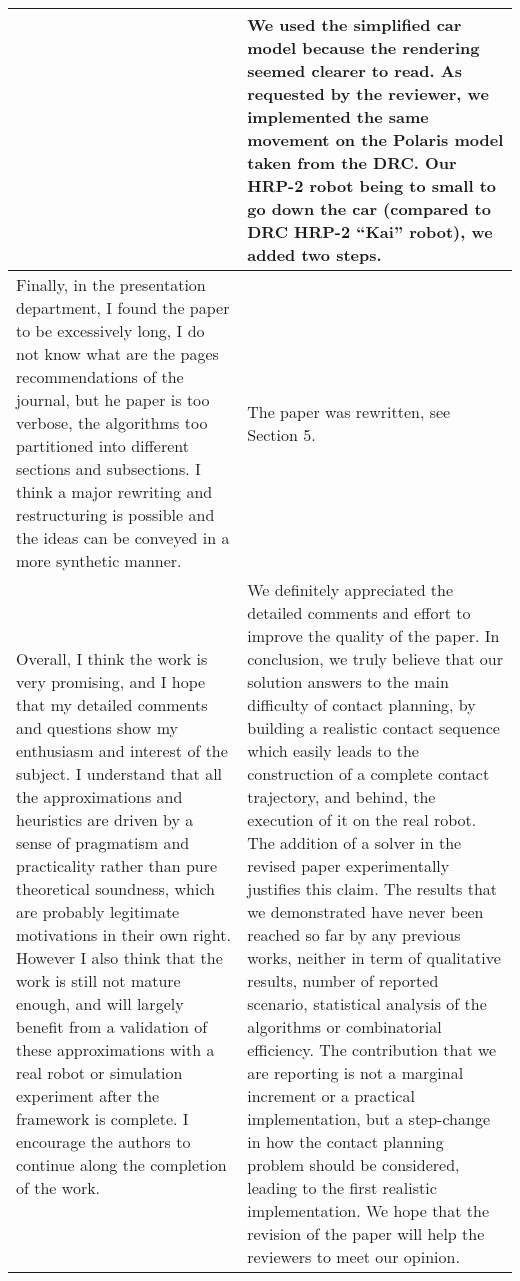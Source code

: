 \documentclass[a4paper]{article}
\begin{document}
\begin{longtable}{|p{21em}|p{21em}|}
&
We used the simplified car model because the rendering seemed clearer to read.
As requested by the reviewer, we implemented the same movement on the Polaris model taken from the DRC.
Our HRP-2 robot being to small to go down the car (compared to DRC HRP-2 ``Kai'' robot), we added two steps.
\\ \hline %
Finally, in the presentation department, I found the paper to be excessively long, I do not know what are the pages recommendations of the journal, but he paper is too verbose, the algorithms too partitioned into different sections and subsections. I think a major rewriting and restructuring is possible and the ideas can be conveyed in a more synthetic manner.
&
The paper was rewritten, see Section 5.
\\ \hline %
Overall, I think the work is very promising, and I hope that my detailed comments and questions show my enthusiasm and interest of the subject. I understand that all the approximations and heuristics are driven by a sense of  pragmatism and practicality rather than pure theoretical soundness, which are probably legitimate motivations in their own right. However I also think that the work is still not mature enough, and will largely benefit from a validation of these approximations with a real robot or simulation experiment after the framework is complete. I encourage the authors to continue along the completion of the work.
&
We definitely appreciated the detailed comments and effort to improve the quality of the paper.
In conclusion, we truly believe that our solution answers to the main difficulty of contact planning, by building a realistic contact sequence which easily leads to the construction of a complete contact trajectory, and behind, the execution of it on the real robot.
The addition of a \mP3 solver in the revised paper experimentally justifies this claim.
The results that we demonstrated have never been reached so far by any previous works, neither in term of qualitative results, number of reported scenario, statistical analysis of the algorithms or combinatorial efficiency.
The contribution that we are reporting is not a marginal increment or a practical implementation, but a step-change in how the contact planning problem should be considered, leading to the first realistic implementation.
We hope that the revision of the paper will help the reviewers to meet our opinion.

\\ \hline %
\end{longtable}
\end{document}
